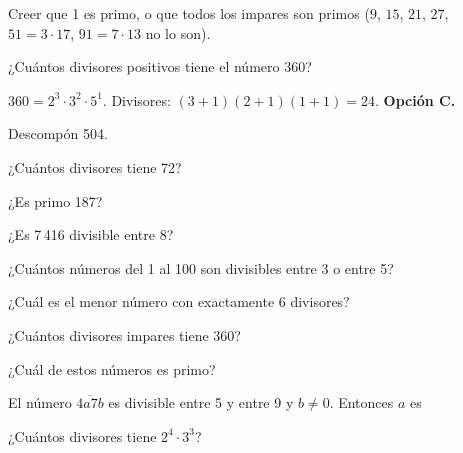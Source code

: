 \begin{trampa}
Creer que 1 es primo, o que todos los impares son primos ($9$, $15$, $21$, $27$, $51 = 3 \cdot 17$, $91 = 7 \cdot 13$
no lo son).
\end{trampa}

\begin{reto}
¿Cuántos divisores positivos tiene el número 360?
\end{reto}

\begin{retoresuelto}
$360 = 2^3 \cdot 3^2 \cdot 5^1$. Divisores: $(3 + 1)(2 + 1)(1 + 1) = 24$. \textbf{Opción C.}
\end{retoresuelto}

\taller
{}
\begin{ejercicios}[2]
\item Descompón 504. 
\item ¿Cuántos divisores tiene 72? 
\item ¿Es primo 187? 
\item ¿Es 7\,416 divisible entre 8? 
\end{ejercicios}
\begin{ejercicios}
\item ¿Cuántos números del 1 al 100 son divisibles entre 3 o entre 5? 
\item ¿Cuál es el menor número con exactamente 6 divisores? 
\item ¿Cuántos divisores impares tiene 360? 
\end{ejercicios}
\begin{ejercicios}
\item ¿Cuál de estos números es primo?
\item El número $\overline{4a7b}$ es divisible entre 5 y entre 9 y $b \ne 0$. Entonces $a$ es
\item ¿Cuántos divisores tiene $2^4 \cdot 3^3$?
\end{ejercicios}

